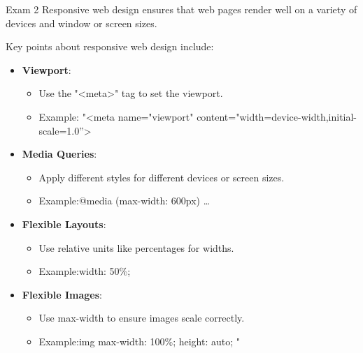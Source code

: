 \begin{examnotes}{Exam 2}
    Responsive web design ensures that web pages render well on a variety of devices and window or screen sizes.
    
    \begin{highlight}
        Key points about responsive web design include:
        
        \begin{itemize}
            \item \textbf{Viewport}:
                \begin{itemize}
                    \item Use the "<meta>" tag to set the viewport.
                    \item Example: "<meta name="viewport" content="width=device-width,initial-scale=1.0”>
                \end{itemize} 
            \item \textbf{Media Queries}: 
            \begin{itemize} 
                \item Apply different styles for different devices or screen sizes. 
                \item Example:@media (max-width: 600px) { … }
            \end{itemize} 
            \item \textbf{Flexible Layouts}: 
            \begin{itemize} 
                \item Use relative units like percentages for widths. 
                \item Example:width: 50\%;
            \end{itemize} 
            \item \textbf{Flexible Images}: 
            \begin{itemize} 
                \item Use max-width to ensure images scale correctly. 
                \item Example:img { max-width: 100\%; height: auto; }"
            \end{itemize} 
        \end{itemize}
    \end{highlight}


\end{examnotes}
